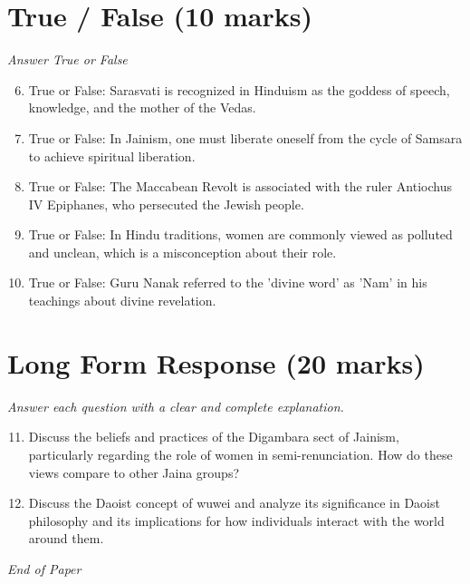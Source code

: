 \documentclass[12pt]{article}
\begin{document}
\section*{True / False (10 marks)}
\textit{Answer True or False}
\begin{enumerate}[label=\arabic*.]
\setcounter{enumi}{5}
\item True or False: Sarasvati is recognized in Hinduism as the goddess of speech, knowledge, and the mother of the Vedas.
\item True or False: In Jainism, one must liberate oneself from the cycle of Samsara to achieve spiritual liberation.
\item True or False: The Maccabean Revolt is associated with the ruler Antiochus IV Epiphanes, who persecuted the Jewish people.
\item True or False: In Hindu traditions, women are commonly viewed as polluted and unclean, which is a misconception about their role.
\item True or False: Guru Nanak referred to the 'divine word' as 'Nam' in his teachings about divine revelation.
\end{enumerate}

\section*{Long Form Response (20 marks)}
\textit{Answer each question with a clear and complete explanation.}
\begin{enumerate}[label=\arabic*.]
\setcounter{enumi}{10}
\item Discuss the beliefs and practices of the Digambara sect of Jainism, particularly regarding the role of women in semi-renunciation. How do these views compare to other Jaina groups?
\item Discuss the Daoist concept of wuwei and analyze its significance in Daoist philosophy and its implications for how individuals interact with the world around them.
\end{enumerate}

\vfill
\noindent\textit{End of Paper}
\end{document}
